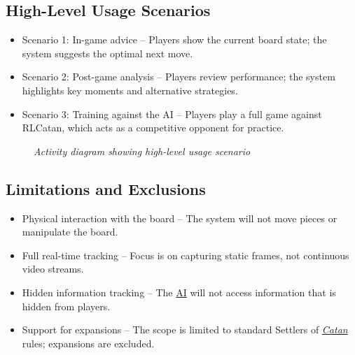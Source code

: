 \documentclass{article}
\newcommand{\Catan}{\href{https://en.wikipedia.org/wiki/Catan}{Catan}}
\newcommand{\AI}{\href{https://en.wikipedia.org/wiki/Artificial_intelligence}{AI}}
\begin{document}
\subsection{High-Level Usage Scenarios}\label{subsec:high-level-usage-scenarios}
\begin{itemize}
    \item {Scenario 1: In-game advice} – Players show the current board state; the system suggests the optimal next move.
    \item {Scenario 2: Post-game analysis} – Players review performance; the system highlights key moments and alternative strategies.
    \item {Scenario 3: Training against the AI} – Players play a full game against RLCatan, which acts as a competitive opponent for practice.
\end{itemize}
\begin{figure}[H]
    \caption{\textit{Activity diagram showing high-level usage scenario}}
    \label{fig:activity-diagram}
\end{figure}


\subsection{Limitations and Exclusions}\label{subsec:limitations-and-exclusions}
\begin{itemize}
    \item {Physical interaction with the board} – The system will not move pieces or manipulate the board.
    \item {Full real-time tracking} – Focus is on capturing static frames, not continuous video streams.
    \item {Hidden information tracking} – The \AI{} will not access information that is hidden from players.
    \item {Support for expansions} – The scope is limited to standard Settlers of \emph{\Catan{}} rules; expansions are excluded.
\end{itemize}
\end{document}
